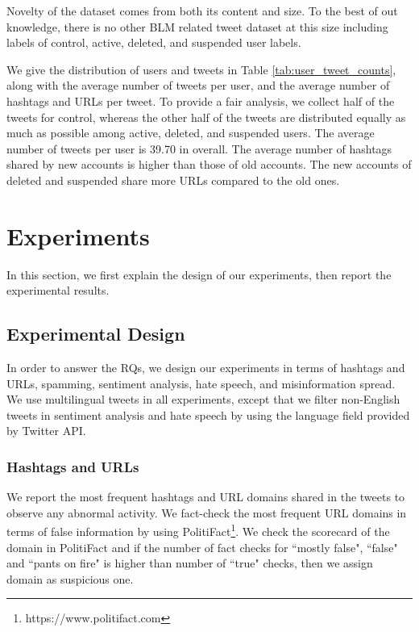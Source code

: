 \documentclass[sigconf]{acmart}
\begin{document}
Novelty of the dataset comes from both its content and size. To the best of out knowledge, there is no other BLM related tweet dataset at this size including labels of control, active, deleted, and suspended user labels. 

We give the distribution of users and tweets in Table \ref{tab:user_tweet_counts}, along with the average number of tweets per user, and the average number of hashtags and URLs per tweet. To provide a fair analysis, we collect half of the tweets for control, whereas the other half of the tweets are distributed equally as much as possible among active, deleted, and suspended users. The average number of tweets per user is 39.70 in overall. The average number of hashtags shared by new accounts is higher than those of old accounts. The new accounts of deleted and suspended share more URLs compared to the old ones.

    
\section{Experiments}
\label{section:experiments}

In this section, we first explain the design of our experiments, then report the experimental results.

\subsection{Experimental Design}
In order to answer the RQs, we design our experiments in terms of hashtags and URLs, spamming, sentiment analysis, hate speech, and misinformation spread. We use multilingual tweets in all experiments, except that we filter non-English tweets in sentiment analysis and hate speech by using the language field provided by Twitter API.

\subsubsection{Hashtags and URLs}
We report the most frequent hashtags and URL domains shared in the tweets to observe any abnormal activity. We fact-check the most frequent URL domains in terms of false information by using PolitiFact\footnote{https://www.politifact.com}. We check the scorecard of the domain in PolitiFact and if the number of fact checks for ``mostly false", ``false" and ``pants on fire" is higher than number of ``true" checks, then we assign domain as suspicious one.
\end{document}
